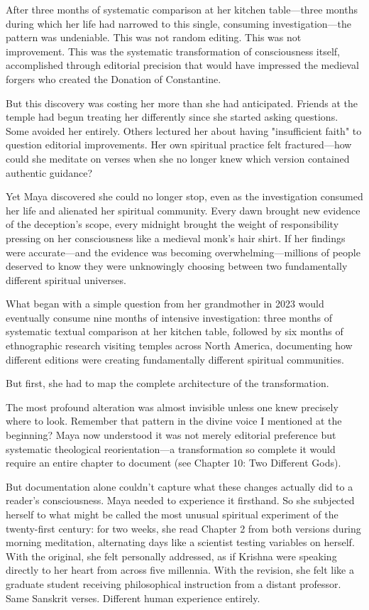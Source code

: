\documentclass[12pt,twoside]{book}
\begin{document}
After three months of systematic comparison at her kitchen table—three months during which her life had narrowed to this single, consuming investigation—the pattern was undeniable. This was not random editing. This was not improvement. This was the systematic transformation of consciousness itself, accomplished through editorial precision that would have impressed the medieval forgers who created the Donation of Constantine.

But this discovery was costing her more than she had anticipated. Friends at the temple had begun treating her differently since she started asking questions. Some avoided her entirely. Others lectured her about having "insufficient faith" to question editorial improvements. Her own spiritual practice felt fractured—how could she meditate on verses when she no longer knew which version contained authentic guidance?

Yet Maya discovered she could no longer stop, even as the investigation consumed her life and alienated her spiritual community. Every dawn brought new evidence of the deception's scope, every midnight brought the weight of responsibility pressing on her consciousness like a medieval monk's hair shirt. If her findings were accurate—and the evidence was becoming overwhelming—millions of people deserved to know they were unknowingly choosing between two fundamentally different spiritual universes.

What began with a simple question from her grandmother in 2023 would eventually consume nine months of intensive investigation: three months of systematic textual comparison at her kitchen table, followed by six months of ethnographic research visiting temples across North America, documenting how different editions were creating fundamentally different spiritual communities.

But first, she had to map the complete architecture of the transformation.

The most profound alteration was almost invisible unless one knew precisely where to look. Remember that pattern in the divine voice I mentioned at the beginning? Maya now understood it was not merely editorial preference but systematic theological reorientation—a transformation so complete it would require an entire chapter to document (see Chapter 10: Two Different Gods).

But documentation alone couldn't capture what these changes actually did to a reader's consciousness. Maya needed to experience it firsthand. So she subjected herself to what might be called the most unusual spiritual experiment of the twenty-first century: for two weeks, she read Chapter 2 from both versions during morning meditation, alternating days like a scientist testing variables on herself. With the original, she felt personally addressed, as if Krishna were speaking directly to her heart from across five millennia. With the revision, she felt like a graduate student receiving philosophical instruction from a distant professor. Same Sanskrit verses. Different human experience entirely.
\end{document}
